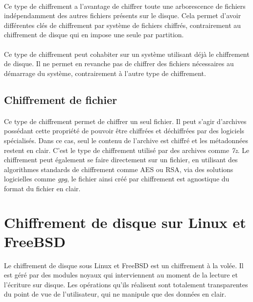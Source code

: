 \paragraph{}
Ce type de chiffrement a l'avantage de chiffrer toute une arborescence de
fichiers indépendamment des autres fichiers présents sur le disque. Cela permet
d'avoir différentes clés de chiffrement par système de fichiers chiffrés,
contrairement au chiffrement de disque qui en impose une seule par partition.
\paragraph{}
Ce type de chiffrement peut cohabiter sur un système utilisant déjà le
chiffrement de disque. Il ne permet en revanche pas de chiffrer des fichiers
nécessaires au démarrage du système, contrairement à l'autre type de
chiffrement.

\subsection{Chiffrement de fichier}
\paragraph{}
Ce type de chiffrement permet de chiffrer un seul fichier. Il peut s'agir
d'archives possédant cette propriété de pouvoir être chiffrées et déchiffrées
par des logiciels spécialisés. Dans ce cas, seul le contenu de l'archive est
chiffré et les métadonnées restent en clair. C'est le type de chiffrement
utilisé par des archives comme \textit{7z}. Le chiffrement peut également se
faire directement sur un fichier, en utilisant des algorithmes standards de 
chiffrement comme AES ou RSA, via des solutions logicielles comme
\textit{gpg}, le fichier ainsi créé par chiffrement est agnostique du format 
du fichier en clair.


\section{Chiffrement de disque sur Linux et FreeBSD}

\paragraph{}
Le chiffrement de disque sous Linux et FreeBSD est un chiffrement à la volée. Il
est géré par des modules noyaux qui interviennent au moment de la lecture et
l'écriture sur disque. Les opérations qu'ils réalisent sont totalement
transparentes du point de vue de l'utilisateur, qui ne manipule que des données
en clair.
